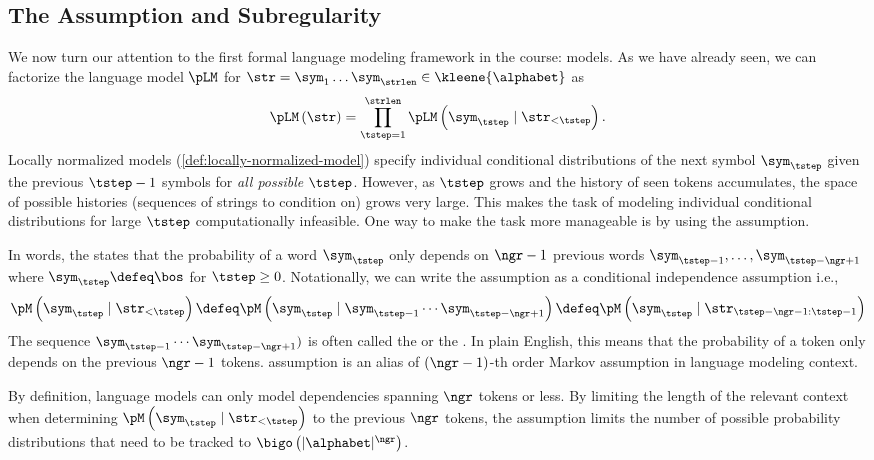 \subsection{The \ngram{} Assumption and Subregularity} \label{sec:n-gram-models}
We now turn our attention to the first formal language modeling framework in the course: \ngram{} models. 
As we have already seen, we can factorize the language model $\pLM$ for $\str = \sym_1 \ldots \sym_\strlen \in \kleene{\alphabet}$ as
\begin{equation} \label{eq:locally-normalized-lm}
    \pLM\left(\str\right) = \prod_{\tstep = 1}^{\strlen}\pLM\left(\sym_\tstep \mid \str_{<\tstep}\right).
\end{equation}
Locally normalized models (\cref{def:locally-normalized-model}) specify individual conditional distributions of the next symbol $\sym_\tstep$ given the previous $\tstep - 1$ symbols for \emph{all possible} $\tstep$.
However, as $\tstep$ grows and the history of seen tokens accumulates, the space of possible histories (sequences of strings to condition on) grows very large.
This makes the task of modeling individual conditional distributions for large $\tstep$ computationally infeasible. 
One way to make the task more manageable is by using the \ngram{} assumption.
\begin{assumption}
In words, the  states that the probability of a word $\sym_\tstep$ only depends on $\ngr-1$ previous words $\sym_{\tstep-1},\ldots,\sym_{\tstep-\ngr+1}$ where $\sym_\tstep \defeq \bos$ for $\tstep \geq 0$. 
Notationally, we can write the \ngram{} assumption as a conditional independence assumption i.e., 
\begin{equation}
    \pM\left(\sym_\tstep\mid \str_{<\tstep}\right) \defeq \pM\left(\sym_\tstep \mid \sym_{\tstep-1} \cdots \sym_{\tstep-\ngr+1}\right) \defeq \pM\left(\sym_\tstep \mid \str_{\tstep - \ngr - 1 : \tstep - 1}\right)
\end{equation}
The sequence $\sym_{\tstep-1} \cdots \sym_{\tstep-\ngr+1})$ is often called the  or the .
In plain English, this means that the probability of a token only depends on the previous $\ngr-1$ tokens. \ngram{} assumption is an alias of $(\ngr-1)$-th order Markov assumption in language modeling context.
\end{assumption}
By definition, \ngram{} language models can only model dependencies spanning $\ngr$ tokens or less.
By limiting the length of the relevant context when determining $\pM\left(\sym_\tstep\mid\str_{<\tstep}\right)$ to the previous $\ngr$ tokens, the \ngram{} assumption limits the number of possible probability distributions that need to be tracked to $\bigo\left(|\alphabet|^{\ngr}\right)$. 

